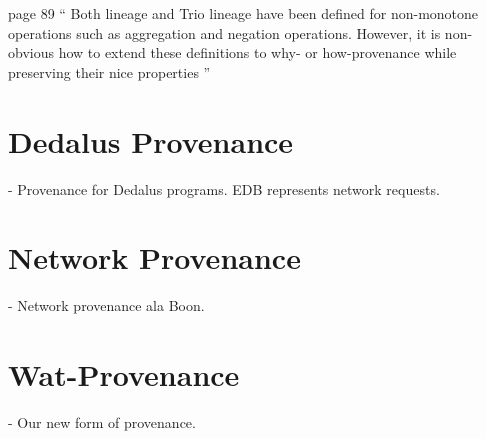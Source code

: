 \documentclass{mwhittaker}
\begin{document}
page 89
``
Both lineage and Trio lineage have been defined for non-monotone operations
such as aggregation and negation operations. However, it is non-obvious how to
extend these definitions to why- or how-provenance while preserving their nice
properties
''

\section{Dedalus Provenance}
- Provenance for Dedalus programs. EDB represents network requests.

\section{Network Provenance}
- Network provenance ala Boon.

\section{Wat-Provenance}
- Our new form of provenance.
\end{document}
